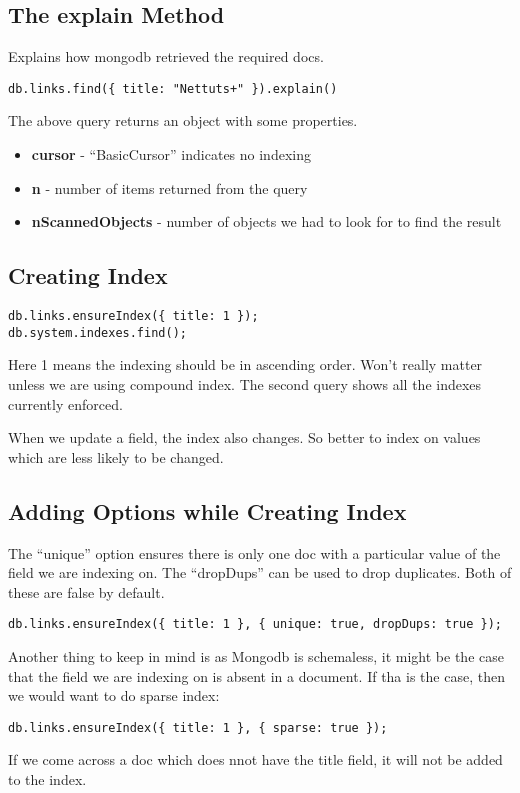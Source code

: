 \documentclass[a4paper, 12pt]{article}
\begin{document}
\subsection{The explain Method}
Explains how mongodb retrieved the required docs.
\begin{verbatim}
db.links.find({ title: "Nettuts+" }).explain()
\end{verbatim}
The above query returns an object with some properties.
\begin{itemize}
	\item \textbf{cursor} - ``BasicCursor'' indicates no indexing
	\item \textbf{n} - number of items returned from the query
	\item \textbf{nScannedObjects} - number of objects we had to look for to find the result
\end{itemize}
\subsection{Creating Index}
\begin{verbatim}
db.links.ensureIndex({ title: 1 });
db.system.indexes.find();
\end{verbatim}
Here 1 means the indexing should be in ascending order. Won't really matter unless we are using compound index. The second query shows all the indexes currently enforced.

When we update a field, the index also changes. So better to index on values which are less likely to be changed.
\subsection{Adding Options while Creating Index}
The ``unique'' option ensures there is only one doc with a particular value of the field we are indexing on. The ``dropDups'' can be used to drop duplicates. Both of these are false by default.
\begin{verbatim}
db.links.ensureIndex({ title: 1 }, { unique: true, dropDups: true });
\end{verbatim}

Another thing to keep in mind is as Mongodb is schemaless, it might be the case that the field we are indexing on is absent in a document. If tha is the case, then we would want to do sparse index:
\begin{verbatim}
db.links.ensureIndex({ title: 1 }, { sparse: true });
\end{verbatim}
If we come across a doc which does nnot have the title field, it will not be added to the index.
\end{document}
